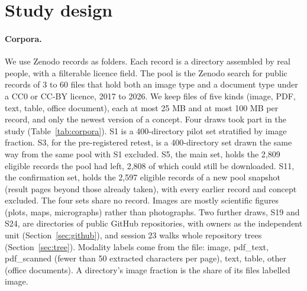 \documentclass[11pt]{article}
\begin{document}
\section{Study design}
\label{sec:design}

\paragraph{Corpora.} We use Zenodo records as folders. Each record is a directory assembled by real people, with a filterable licence field. The pool is the Zenodo search for public records of 3 to 60 files that hold both an image type and a document type under a CC0 or CC-BY licence, 2017 to 2026. We keep files of five kinds (image, PDF, text, table, office document), each at most 25 MB and at most 100 MB per record, and only the newest version of a concept. Four draws took part in the study (Table~\ref{tab:corpora}). S1 is a 400-directory pilot set stratified by image fraction. S3, for the pre-registered retest, is a 400-directory set drawn the same way from the same pool with S1 excluded. S5, the main set, holds the 2,809 eligible records the pool had left, 2,808 of which could still be downloaded. S11, the confirmation set, holds the 2,597 eligible records of a new pool snapshot (result pages beyond those already taken), with every earlier record and concept excluded. The four sets share no record. Images are mostly scientific figures (plots, maps, micrographs) rather than photographs. Two further draws, S19 and S24, are directories of public GitHub repositories, with owners as the independent unit (Section~\ref{sec:github}), and session 23 walks whole repository trees (Section~\ref{sec:tree}). Modality labels come from the file: image, pdf\_text, pdf\_scanned (fewer than 50 extracted characters per page), text, table, other (office documents). A directory's image fraction is the share of its files labelled image.
\end{document}
